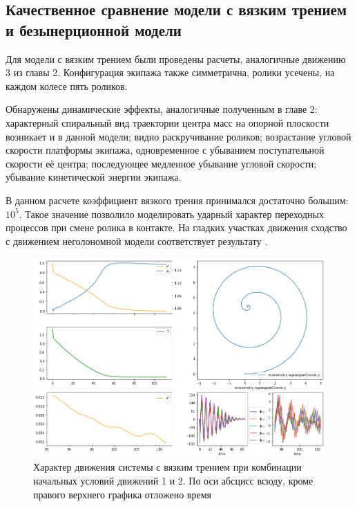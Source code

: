 \subsection{Качественное сравнение модели с вязким трением и безынерционной модели}

Для модели с вязким трением были проведены расчеты, аналогичные движению 3 из главы 2. Конфигурация экипажа также симметрична, ролики усечены, на каждом колесе пять роликов.

Обнаружены динамические эффекты, аналогичные полученным в главе 2: характерный спиральный вид траектории центра масс на опорной плоскости возникает и в данной модели; видно раскручивание роликов; возрастание угловой скорости платформы экипажа, одновременное с убыванием поступательной скорости её центра; последующее медленное убывание угловой скорости; убывание кинетической энергии экипажа.

В данном расчете коэффициент вязкого трения принимался достаточно большим: $10^{5}$. Такое значение позволило моделировать ударный характер переходных процессов при смене ролика в контакте. На гладких участках движения сходство с движением неголономной модели соответствует результату \cite{karapetyan1981negolonom}.

\begin{figure}[htb]
\centerline{\includegraphics[width=\linewidth]{content/pic/new/visc_3_100.png}}
\caption{Характер движения системы с вязким трением при комбинации начальных условий движений 1 и 2. По оси абсцисс всюду, кроме правого верхнего графика отложено время}
\label{fig2}
\end{figure}

